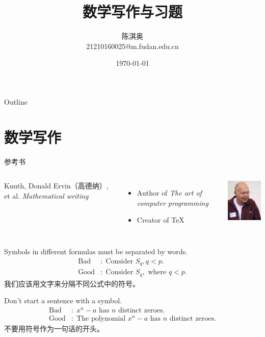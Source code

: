 \documentclass[presentation]{beamer}
\author{陈淇奥\\21210160025@m.fudan.edu.cn}
\date{\today}
\title{数学写作与习题}
\begin{document}
\maketitle
\begin{frame}{Outline}
\tableofcontents
\end{frame}





\section{数学写作}
\label{sec:org942f032}
\begin{frame}[label={sec:org8fb2f1e}]{参考书}
\begin{columns}[onlytextwidth,T]
  \column{\dimexpr\linewidth-30mm-5mm}
\vspace{0.4cm}
Knuth, Donald Ervin（高德纳）, et al. \textit{Mathematical writing}
\vspace{0.2cm}
\begin{itemize}
\item Author of \textit{The art of computer programming}
\item Creator of \TeX
\end{itemize}

  \column{30mm}
\includegraphics[width=30mm]{2.jpg}

\end{columns}
\end{frame}
\begin{frame}[label={sec:org3f8c5ac}]{1}
Symbols in different formulas must be separated by words.
\begin{align*}
\text{Bad}&:\;\text{Consider }S_q,q<p.\\
\text{Good}&:\;\text{Consider } S_q, \text{ where }q<p.
\end{align*}
\vspace{5mm} 我们应该用文字来分隔不同公式中的符号。
\end{frame}
\begin{frame}[label={sec:orgbe5984b}]{2}
Don't start a sentence with a symbol.
\begin{align*}
    \text{Bad}&:\;x^n-a\text{ has }n\text{ distinct zeroes}.\\
    \text{Good}&:\;\text{The polynomial }x^n-a\text{ has }n\text{ distinct zeroes}.
    \end{align*}
\vspace{5mm} 不要用符号作为一句话的开头。
\end{frame}
\end{document}
